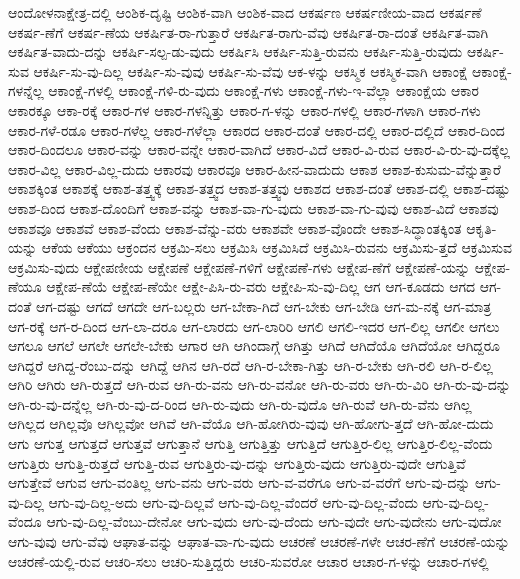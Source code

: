 {ಆಂದೋಳನಾಕ್ಷೇತ್ರ-ದಲ್ಲಿ
ಆಂಶಿಕ-ದೃಷ್ಟಿ
ಆಂಶಿಕ-ವಾಗಿ
ಆಂಶಿಕ-ವಾದ
ಆಕರ್ಷಣ
ಆಕರ್ಷಣೀಯ-ವಾದ
ಆಕರ್ಷಣೆ
ಆಕರ್ಷ-ಣೆಗೆ
ಆಕರ್ಷ-ಣೆಯ
ಆಕರ್ಷಿತ-ರಾ-ಗುತ್ತಾರೆ
ಆಕರ್ಷಿತ-ರಾಗು-ವೆವು
ಆಕರ್ಷಿತ-ರಾ-ದಂತೆ
ಆಕರ್ಷಿತ-ವಾಗಿ
ಆಕರ್ಷಿತ-ವಾದು-ದನ್ನು
ಆಕರ್ಷಿ-ಸಲ್ಪ-ಡು-ವುದು
ಆಕರ್ಷಿಸಿ
ಆಕರ್ಷಿ-ಸುತ್ತಿ-ರುವನು
ಆಕರ್ಷಿ-ಸುತ್ತಿ-ರುವುದು
ಆಕರ್ಷಿ-ಸುವ
ಆಕರ್ಷಿ-ಸು-ವು-ದಿಲ್ಲ
ಆಕರ್ಷಿ-ಸು-ವುವು
ಆಕರ್ಷಿ-ಸು-ವೆವು
ಆಕ-ಳನ್ನು
ಆಕಸ್ಮಿಕ
ಆಕಸ್ಮಿಕ-ವಾಗಿ
ಆಕಾಂಕ್ಷೆ
ಆಕಾಂಕ್ಷೆ-ಗಳನ್ನೆಲ್ಲ
ಆಕಾಂಕ್ಷೆ-ಗಳಲ್ಲಿ
ಆಕಾಂಕ್ಷೆ-ಗಳಿ-ರು-ವುದು
ಆಕಾಂಕ್ಷೆ-ಗಳು
ಆಕಾಂಕ್ಷೆ-ಗಳು-ಇ-ವೆಲ್ಲಾ
ಆಕಾಂಕ್ಷೆಯ
ಆಕಾರ
ಆಕಾರಕ್ಕೂ
ಆಕಾ-ರಕ್ಕೆ
ಆಕಾರ-ಗಳ
ಆಕಾರ-ಗಳನ್ನಿತ್ತು
ಆಕಾರ-ಗ-ಳನ್ನು
ಆಕಾರ-ಗಳಲ್ಲಿ
ಆಕಾರ-ಗಳಾಗಿ
ಆಕಾರ-ಗಳು
ಆಕಾರ-ಗಳೆ-ರಡೂ
ಆಕಾರ-ಗಳೆಲ್ಲ
ಆಕಾರ-ಗಳೆಲ್ಲಾ
ಆಕಾರದ
ಆಕಾರ-ದಂತೆ
ಆಕಾರ-ದಲ್ಲಿ
ಆಕಾರ-ದಲ್ಲಿದೆ
ಆಕಾರ-ದಿಂದ
ಆಕಾರ-ದಿಂದಲೂ
ಆಕಾರ-ವನ್ನು
ಆಕಾರ-ವನ್ನೇ
ಆಕಾರ-ವಾಗಿದೆ
ಆಕಾರ-ವಿದೆ
ಆಕಾರ-ವಿ-ರುವ
ಆಕಾರ-ವಿ-ರು-ವು-ದಕ್ಕೆಲ್ಲ
ಆಕಾರ-ವಿಲ್ಲ
ಆಕಾರ-ವಿಲ್ಲ-ದುದು
ಆಕಾರವು
ಆಕಾರವೂ
ಆಕಾರ-ಹೀನ-ವಾದುದು
ಆಕಾಶ
ಆಕಾಶ-ಕುಸುಮ-ವೆನ್ನುತ್ತಾರೆ
ಆಕಾಶಕ್ಕಿಂತ
ಆಕಾಶಕ್ಕೆ
ಆಕಾಶ-ತತ್ತ್ವಕ್ಕೆ
ಆಕಾಶ-ತತ್ತ್ವದ
ಆಕಾಶ-ತತ್ತ್ವವು
ಆಕಾಶದ
ಆಕಾಶ-ದಂತೆ
ಆಕಾಶ-ದಲ್ಲಿ
ಆಕಾಶ-ದಷ್ಟು
ಆಕಾಶ-ದಿಂದ
ಆಕಾಶ-ದೊಂದಿಗೆ
ಆಕಾಶ-ವನ್ನು
ಆಕಾಶ-ವಾ-ಗು-ವುದು
ಆಕಾಶ-ವಾ-ಗು-ವುವು
ಆಕಾಶ-ವಿದೆ
ಆಕಾಶವು
ಆಕಾಶವೂ
ಆಕಾಶವೆ
ಆಕಾಶ-ವೆಂದು
ಆಕಾಶ-ವೆನ್ನು-ವರು
ಆಕಾಶವೇ
ಆಕಾಶ-ವೊಂದೇ
ಆಕಾಶ-ಸಿದ್ಧಾಂತಕ್ಕಿಂತ
ಆಕೃತಿ-ಯನ್ನು
ಆಕೆಯ
ಆಕೆಯು
ಆಕ್ರಂದನ
ಆಕ್ರಮಿ-ಸಲು
ಆಕ್ರಮಿಸಿ
ಆಕ್ರಮಿಸಿದೆ
ಆಕ್ರಮಿಸಿ-ರುವನು
ಆಕ್ರಮಿಸು-ತ್ತದೆ
ಆಕ್ರಮಿಸುವ
ಆಕ್ರಮಿಸು-ವುದು
ಆಕ್ಷೇಪಣೀಯ
ಆಕ್ಷೇಪಣೆ
ಆಕ್ಷೇಪಣೆ-ಗಳಿಗೆ
ಆಕ್ಷೇಪಣೆ-ಗಳು
ಆಕ್ಷೇಪ-ಣೆಗೆ
ಆಕ್ಷೇಪಣೆ-ಯನ್ನು
ಆಕ್ಷೇಪ-ಣೆಯೂ
ಆಕ್ಷೇಪ-ಣೆಯೆ
ಆಕ್ಷೇಪ-ಣೆಯೇ
ಆಕ್ಷೇ-ಪಿಸಿ-ರು-ವರು
ಆಕ್ಷೇಪಿ-ಸು-ವು-ದಿಲ್ಲ
ಆಗ
ಆಗ-ಕೂಡದು
ಆಗದ
ಆಗ-ದಂತೆ
ಆಗ-ದಷ್ಟು
ಆಗದೆ
ಆಗದೇ
ಆಗ-ಬಲ್ಲರು
ಆಗ-ಬೇಕಾ-ಗಿದೆ
ಆಗ-ಬೇಕು
ಆಗ-ಬೇಡಿ
ಆಗ-ಮ-ನಕ್ಕೆ
ಆಗ-ಮಾತ್ರ
ಆಗ-ರಕ್ಕೆ
ಆಗ-ರ-ದಿಂದ
ಆಗ-ಲಾ-ದರೂ
ಆಗ-ಲಾರದು
ಆಗ-ಲಾರಿರಿ
ಆಗಲಿ
ಆಗಲಿ-ಇದರ
ಆಗ-ಲಿಲ್ಲ
ಆಗಲೀ
ಆಗಲು
ಆಗಲೂ
ಆಗಲೆ
ಆಗಲೇ
ಆಗಲೇ-ಬೇಕು
ಆಗಾರ
ಆಗಿ
ಆಗಿಂದಾಗ್ಗೆ
ಆಗಿತ್ತು
ಆಗಿದೆ
ಆಗಿದೆಯೊ
ಆಗಿದೆಯೋ
ಆಗಿದ್ದರೂ
ಆಗಿದ್ದರೆ
ಆಗಿದ್ದ-ರೆಂಬು-ದನ್ನು
ಆಗಿದ್ದೆ
ಆಗಿನ
ಆಗಿ-ರದೆ
ಆಗಿ-ರ-ಬೇಕಾ-ಗಿತ್ತು
ಆಗಿ-ರ-ಬೇಕು
ಆಗಿ-ರಲಿ
ಆಗಿ-ರ-ಲಿಲ್ಲ
ಆಗಿರಿ
ಆಗಿರು
ಆಗಿ-ರುತ್ತದೆ
ಆಗಿ-ರುವ
ಆಗಿ-ರು-ವನು
ಆಗಿ-ರು-ವನೋ
ಆಗಿ-ರು-ವರು
ಆಗಿ-ರು-ವಿರಿ
ಆಗಿ-ರು-ವು-ದನ್ನು
ಆಗಿ-ರು-ವು-ದನ್ನೆಲ್ಲ
ಆಗಿ-ರು-ವು-ದ-ರಿಂದ
ಆಗಿ-ರು-ವುದು
ಆಗಿ-ರು-ವುದೊ
ಆಗಿ-ರುವೆ
ಆಗಿ-ರು-ವೆನು
ಆಗಿಲ್ಲ
ಆಗಿಲ್ಲದ
ಆಗಿಲ್ಲವೊ
ಆಗಿಲ್ಲವೋ
ಆಗಿವೆ
ಆಗಿ-ವೆಯೊ
ಆಗಿ-ಹೋಗಿರು-ವುವು
ಆಗಿ-ಹೋಗು-ತ್ತದೆ
ಆಗಿ-ಹೋ-ದುದು
ಆಗು
ಆಗುತ್ತ
ಆಗುತ್ತದೆ
ಆಗುತ್ತವೆ
ಆಗುತ್ತಾನೆ
ಆಗುತ್ತಿ
ಆಗುತ್ತಿತ್ತು
ಆಗುತ್ತಿದೆ
ಆಗುತ್ತಿರ-ಲಿಲ್ಲ
ಆಗುತ್ತಿರ-ಲಿಲ್ಲ-ವೆಂದು
ಆಗುತ್ತಿರು
ಆಗುತ್ತಿ-ರುತ್ತದೆ
ಆಗುತ್ತಿ-ರುವ
ಆಗುತ್ತಿರು-ವು-ದನ್ನು
ಆಗುತ್ತಿರು-ವುದು
ಆಗುತ್ತಿರು-ವುದೇ
ಆಗುತ್ತಿವೆ
ಆಗುತ್ತೇವೆ
ಆಗುವ
ಆಗು-ವಂತಿಲ್ಲ
ಆಗು-ವನು
ಆಗು-ವರು
ಆಗು-ವ-ವರೆಗೂ
ಆಗು-ವ-ವರೆಗೆ
ಆಗು-ವು-ದನ್ನು
ಆಗು-ವು-ದಿಲ್ಲ
ಆಗು-ವು-ದಿಲ್ಲ-ಅದು
ಆಗು-ವು-ದಿಲ್ಲವೆ
ಆಗು-ವು-ದಿಲ್ಲ-ವೆಂದರೆ
ಆಗು-ವು-ದಿಲ್ಲ-ವೆಂದು
ಆಗು-ವು-ದಿಲ್ಲ-ವೆಂದೂ
ಆಗು-ವು-ದಿಲ್ಲ-ವೆಂಬು-ದೇನೋ
ಆಗು-ವುದು
ಆಗು-ವು-ದೆಂದು
ಆಗು-ವುದೇ
ಆಗು-ವುದೇನು
ಆಗು-ವುದೋ
ಆಗು-ವುವು
ಆಗು-ವೆವು
ಆಘಾತ-ವನ್ನು
ಆಘಾತ-ವಾ-ಗು-ವುದು
ಆಚರಣೆ
ಆಚರಣೆ-ಗಳೇ
ಆಚರ-ಣೆಗೆ
ಆಚರಣೆ-ಯನ್ನು
ಆಚರಣೆ-ಯಲ್ಲಿ-ರುವ
ಆಚರಿ-ಸಲು
ಆಚರಿ-ಸುತ್ತಿದ್ದರು
ಆಚರಿ-ಸುವರೋ
ಆಚಾರ
ಆಚಾರ-ಗ-ಳನ್ನು
ಆಚಾರ-ಗಳಲ್ಲಿ
}
